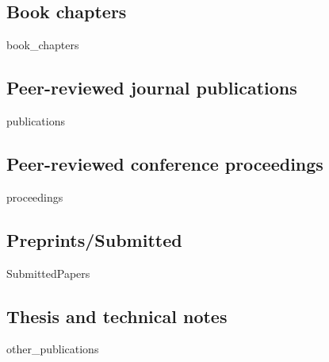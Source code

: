 \documentclass[11pt,a4paper,sans]{moderncv}        %
\begin{document}
\subsection{\textbf{Book chapters}}
\begin{btSect}[unsrt]{book_chapters}
	\btPrintAll
\end{btSect}

\subsection{\textbf{Peer-reviewed journal publications}}

\begin{btSect}[unsrt]{publications}
\btPrintAll
\end{btSect}

\subsection{\textbf{Peer-reviewed conference proceedings}}
\begin{btSect}[unsrt]{proceedings}
\btPrintAll
\end{btSect}


\subsection{\textbf{Preprints/Submitted}}
\begin{btSect}[unsrt]{SubmittedPapers}
\btPrintAll
\end{btSect}


\subsection{\textbf{Thesis and technical notes}}
\begin{btSect}[unsrt]{other_publications}
	\btPrintAll
\end{btSect}
\end{document}
